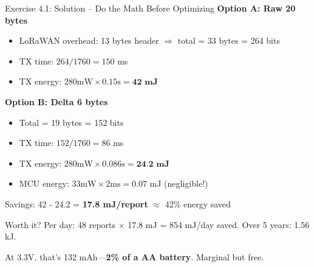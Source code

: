 \documentclass[aspectratio=169,11pt]{beamer}
\begin{document}
\begin{frame}{Exercise 4.1: Solution -- Do the Math Before Optimizing}
    \textbf{Option A: Raw 20 bytes}
    \begin{itemize}
        \item LoRaWAN overhead: 13 bytes header $\Rightarrow$ total = 33 bytes = 264 bits
        \item TX time: $264 / 1760 = 150$ ms
        \item TX energy: $280\text{mW} \times 0.15\text{s} = \textbf{42 mJ}$
    \end{itemize}
    
    \vspace{0.2cm}
    \textbf{Option B: Delta 6 bytes}
    \begin{itemize}
        \item Total = 19 bytes = 152 bits
        \item TX time: $152 / 1760 = 86$ ms
        \item TX energy: $280\text{mW} \times 0.086\text{s} = \textbf{24.2 mJ}$
        \item MCU energy: $33\text{mW} \times 2\text{ms} = 0.07$ mJ (negligible!)
    \end{itemize}
    
    \vspace{0.2cm}
    Savings: 42 - 24.2 = \textbf{17.8 mJ/report} $\approx$ 42\% energy saved
    
    \begin{exampleblock}{Worth it? Per day:}
        48 reports $\times$ 17.8 mJ = 854 mJ/day saved. Over 5 years: 1.56 kJ.
        
        At 3.3V, that's 132 mAh---\textbf{2\% of a AA battery}. Marginal but free.
    \end{exampleblock}
\end{frame}
\end{document}
